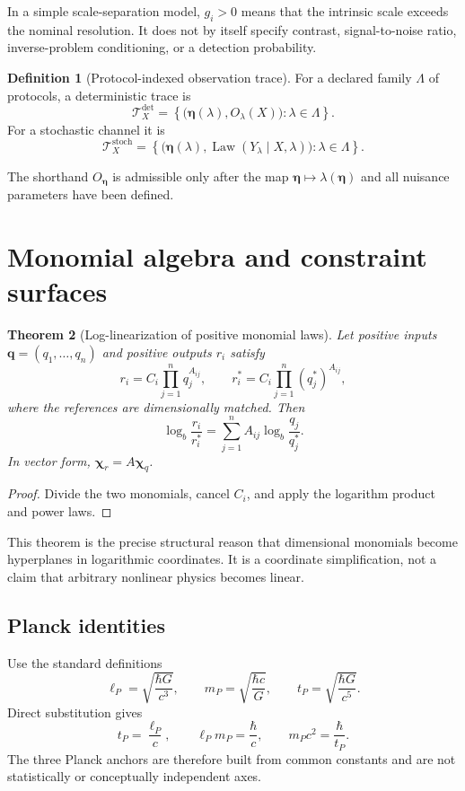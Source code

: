 \documentclass[11pt,a4paper]{article}
\theoremstyle{definition}
\newtheorem{definition}{Definition}[section]
\theoremstyle{plain}
\newtheorem{theorem}[definition]{Theorem}
\theoremstyle{remark}
\newcommand{\Tcal}{\mathcal{T}}
\newcommand{\Law}{\operatorname{Law}}
\newcommand{\set}[1]{\left\{#1\right\}}
\begin{document}
In a simple scale-separation model, $g_i>0$ means that the intrinsic
scale exceeds the nominal resolution. It does not by itself specify
contrast, signal-to-noise ratio, inverse-problem conditioning, or a
detection probability.

\begin{definition}[Protocol-indexed observation trace]
For a declared family $\Lambda$ of protocols, a deterministic trace is
\[
\Tcal_X^{\mathrm{det}}
=
\set{
\bigl(\bm\eta(\lambda),O_\lambda(X)\bigr):
\lambda\in\Lambda
}.
\]
For a stochastic channel it is
\[
\Tcal_X^{\mathrm{stoch}}
=
\set{
\bigl(\bm\eta(\lambda),
\Law(Y_\lambda\mid X,\lambda)\bigr):
\lambda\in\Lambda
}.
\]
\end{definition}

The shorthand $O_{\bm\eta}$ is admissible only after the map
$\bm\eta\mapsto\lambda(\bm\eta)$ and all nuisance parameters have been
defined.

\section{Monomial algebra and constraint surfaces}

\begin{theorem}[Log-linearization of positive monomial laws]
\label{thm:monomial}
Let positive inputs $\bm q=(q_1,\ldots,q_n)$ and positive outputs
$r_i$ satisfy
\[
r_i=C_i\prod_{j=1}^n q_j^{A_{ij}},
\qquad
r_i^*=C_i\prod_{j=1}^n(q_j^*)^{A_{ij}},
\]
where the references are dimensionally matched. Then
\[
\log_b\frac{r_i}{r_i^*}
=
\sum_{j=1}^n A_{ij}
\log_b\frac{q_j}{q_j^*}.
\]
In vector form, $\bm\chi_r=A\bm\chi_q$.
\end{theorem}

\begin{proof}
Divide the two monomials, cancel $C_i$, and apply the logarithm product
and power laws.
\end{proof}

This theorem is the precise structural reason that dimensional
monomials become hyperplanes in logarithmic coordinates. It is a
coordinate simplification, not a claim that arbitrary nonlinear physics
becomes linear.

\subsection{Planck identities}

Use the standard definitions
\[
\ell_P=\sqrt{\frac{\hbar G}{c^3}},
\qquad
m_P=\sqrt{\frac{\hbar c}{G}},
\qquad
t_P=\sqrt{\frac{\hbar G}{c^5}}.
\]
Direct substitution gives
\[
t_P=\frac{\ell_P}{c},
\qquad
\ell_Pm_P=\frac{\hbar}{c},
\qquad
m_Pc^2=\frac{\hbar}{t_P}.
\]
The three Planck anchors are therefore built from common constants and
are not statistically or conceptually independent axes.
\end{document}
